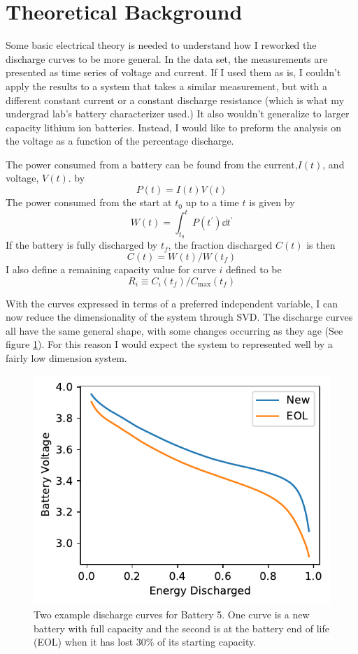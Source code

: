\documentclass{article}
\begin{document}
    \section{Theoretical Background}
    Some basic electrical theory is needed to understand how I reworked the
    discharge curves to be more general. In the data set, the measurements
    are presented as time series of voltage and current. If I used them as is,
    I couldn't apply the results to a system that takes a similar measurement,
    but with a different constant current or a constant discharge resistance
    (which is what my undergrad lab's battery characterizer used.) It also
    wouldn't generalize to larger capacity lithium ion batteries. Instead, I
    would like to preform the analysis on the voltage as a function of the
    percentage discharge.

    The power consumed from a battery can be found from the current,$I(t)$, and
    voltage, $V(t)$.
    by
    $$ P(t) = I(t)V(t) $$
    The power consumed from the start at $t_0$ up to a time $t$ is given by
    $$ W(t) = \int_{t_0}^t P(t^\prime) \dd{t^\prime}$$
    If the battery is fully discharged by $t_f$, the fraction discharged $C(t)$
    is then
    $$ C(t) = W(t)/W(t_f) $$
    I also define a remaining capacity value for curve $i$ defined to be
    \begin{equation}
            R_i \equiv C_i(t_f) / C_{\max}(t_f)
    \end{equation}

    With the curves expressed in terms of a preferred independent variable, I
    can now reduce the dimensionality of the system through SVD. The discharge
    curves all have the same general shape, with some changes occurring as they
    age (See figure \ref{fig:curves_aging}). For this reason I would expect the
    system to represented well by a fairly low dimension system.

    \begin{figure}[tbp]
        \centering
        \includegraphics[width=.7\textwidth]{aging_curves.pdf}
        \caption{\label{fig:curves_aging} Two example discharge curves for
        Battery 5. One curve is a new battery with full capacity and the
        second is at the battery end of life (EOL) when it has lost $30\%$
        of its starting capacity.}
    \end{figure}
\end{document}
